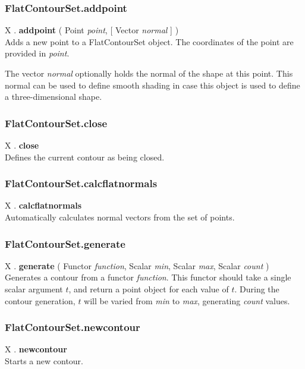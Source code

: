\documentclass[10pt]{book}
\newcommand{\var}[1]{\textit{#1}}
\begin{document}
\subsubsection{FlatContourSet.addpoint \label{F:FlatContourSet:addpoint}}
X . \textbf{addpoint} ( Point \textit{point},  [ Vector \textit{normal} ] ) \\
Adds a new point to a FlatContourSet object. The coordinates of the point are provided in \var{point}.

The vector \var{normal} optionally holds the normal of the shape at this point. This normal can be used to define smooth shading in case this object is used to define a three-dimensional shape.

\subsubsection{FlatContourSet.close \label{F:FlatContourSet:close}}
X . \textbf{close} \\
Defines the current contour as being closed.

\subsubsection{FlatContourSet.calcflatnormals \label{F:FlatContourSet:calcflatnormals}}
X . \textbf{calcflatnormals} \\
Automatically calculates normal vectors from the set of points.

\subsubsection{FlatContourSet.generate \label{F:FlatContourSet:generate}}
X . \textbf{generate} ( Functor \textit{function}, Scalar \textit{min}, Scalar \textit{max}, Scalar \textit{count} ) \\
Generates a contour from a functor \var{function}. This functor should take a single scalar argument $t$, and return a point object for each value of $t$. During the contour generation, $t$ will be varied from \var{min} to \var{max}, generating \var{count} values.

\subsubsection{FlatContourSet.newcontour \label{F:FlatContourSet:newcontour}}
X . \textbf{newcontour} \\
Starts a new contour.
\end{document}
